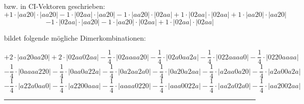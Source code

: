 \documentclass{article}
\begin{document}
\begin{minipage}{\linewidth}
bzw. in CI-Vektoren geschrieben: 
 $$+ 1 \cdot \left|aa20 \right| \cdot \left| aa20 \right| 
- 1 \cdot \left|02aa \right| \cdot \left| aa20 \right| 
- 1 \cdot \left|aa20 \right| \cdot \left| 02aa \right| 
+ 1 \cdot \left|02aa \right| \cdot \left| 02aa \right| 
+ 1 \cdot \left|aa20 \right| \cdot \left| aa20 \right| 
 $$ $$ - 1 \cdot \left|02aa \right| \cdot \left| aa20 \right| 
- 1 \cdot \left|aa20 \right| \cdot \left| 02aa \right| 
+ 1 \cdot \left|02aa \right| \cdot \left| 02aa \right| 
$$



 bildet folgende mögliche Dimerkombinationen:

$$+ 2 \cdot \left|aa20aa20 \right| + 2 \cdot \left|02aa02aa \right| - \frac{1}{4} \cdot \left|02aaaa20 \right| - \frac{1}{4} \cdot \left|02a0aa2a \right| - \frac{1}{4} \cdot \left|022aaaa0 \right| - \frac{1}{4} \cdot \left|0220aaaa \right|  $$ $$ - \frac{1}{4} \cdot \left|0aaaa220 \right| - \frac{1}{4} \cdot \left|0aa0a22a \right| - \frac{1}{4} \cdot \left|0a2aa2a0 \right| - \frac{1}{4} \cdot \left|0a20a2aa \right| - \frac{1}{4} \cdot \left|a2aa0a20 \right| - \frac{1}{4} \cdot \left|a2a00a2a \right|  $$ $$ - \frac{1}{4} \cdot \left|a22a0aa0 \right| - \frac{1}{4} \cdot \left|a2200aaa \right| - \frac{1}{4} \cdot \left|aaaa0220 \right| - \frac{1}{4} \cdot \left|aaa0022a \right| - \frac{1}{4} \cdot \left|aa2a02a0 \right| - \frac{1}{4} \cdot \left|aa2002aa \right| $$



\end{minipage}
\vspace{0.5cm}
\hrule
\vspace{0.5cm}
\end{document}
